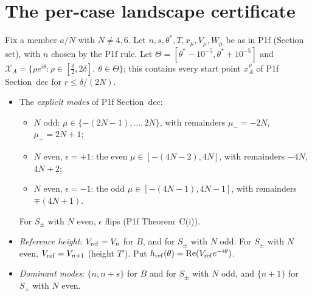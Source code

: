 \documentclass[11pt]{article}
\theoremstyle{remark}\newtheorem{remark}[theorem]{Remark}
\begin{document}
\section{The per-case landscape certificate}\label{sec:cert}
Fix a member $a/N$ with $N\ne4,6$. Let $n,s,\theta^*,T,x_\mu,V_\mu,W_\mu$ be as in P1f (Section set), with $n$ chosen by the P1f rule. Let $\Theta=[\theta^*-10^{-5},\theta^*+10^{-5}]$ and $\mathcal X_A=\{\rho e^{i\theta}:\rho\in[\frac\delta2,2\delta],\ \theta\in\Theta\}$; this contains every start point $x_A^\rho$ of P1f Section~dec for $r\le\delta/(2N)$.
\begin{itemize}
\item The \emph{explicit modes} of P1f Section~dec:
 \begin{itemize}
 \item $N$ odd: $\mu\in\{-(2N-1),\dots,2N\}$, with remainders $\mu_-=-2N$, $\mu_+=2N+1$;
 \item $N$ even, $\epsilon=+1$: the even $\mu\in[-(4N-2),4N]$, with remainders $-4N$, $4N+2$;
 \item $N$ even, $\epsilon=-1$: the odd $\mu\in[-(4N-1),4N-1]$, with remainders $\mp(4N+1)$.
 \end{itemize}
 For $S_\pm$ with $N$ even, $\epsilon$ flips (P1f Theorem~C(i)).
\item \emph{Reference height}: $V_{\rm ref}=V_n$ for $B$, and for $S_\pm$ with $N$ odd. For $S_\pm$ with $N$ even, $V_{\rm ref}=V_{n+1}$ (height $T'$). Put $h_{\rm ref}(\theta)=\operatorname{Re}(V_{\rm ref}e^{-i\theta})$.
\item \emph{Dominant modes}: $\{n,n+s\}$ for $B$ and for $S_\pm$ with $N$ odd, and $\{n+1\}$ for $S_\pm$ with $N$ even.
\end{itemize}
\end{document}
